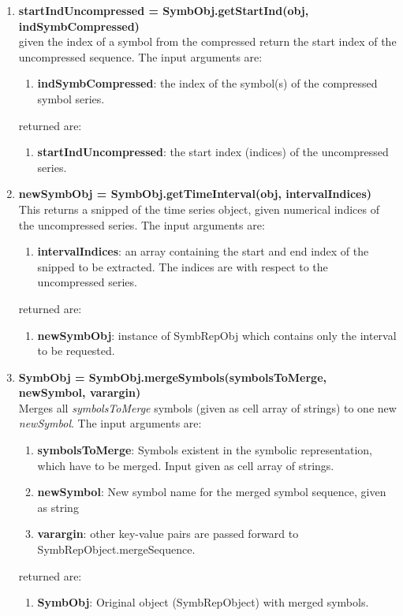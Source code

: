 \documentclass[a4]{scrreprt}
\begin{document}
\begin{enumerate}
	\item \textbf{startIndUncompressed = SymbObj.getStartInd(obj, indSymbCompressed)}\\
		given the index of a symbol from the compressed return the start index of the uncompressed sequence.
		The input arguments are:
		\begin{enumerate}
			\item \textbf{indSymbCompressed}: the index of the symbol(s) of the  compressed symbol series.
		\end{enumerate}
		returned are:
		\begin{enumerate}
			\item \textbf{startIndUncompressed}:  the start index (indices) of the uncompressed series.	
		\end{enumerate}
	
	\item \textbf{newSymbObj = SymbObj.getTimeInterval(obj, intervalIndices)}\\
		This returns a snipped of the time series object, given numerical indices of the uncompressed series.
		The input arguments are:
		\begin{enumerate}
			\item \textbf{intervalIndices}: an array containing the start and end index of the snipped to be extracted. The indices are with  respect to the uncompressed series.
		\end{enumerate}
		returned are:
		\begin{enumerate}
			\item \textbf{newSymbObj}:  instance of SymbRepObj which contains only the interval to be requested.
		\end{enumerate}
	
	\item \textbf{SymbObj = SymbObj.mergeSymbols(symbolsToMerge, newSymbol, varargin)}\\
		Merges all \textit{symbolsToMerge} symbols (given as cell array of strings) to one new \textit{newSymbol}.
		The input arguments are:
		\begin{enumerate}
			\item \textbf{symbolsToMerge}: Symbols existent in the symbolic representation,  which have to be merged. Input given as cell array of strings.
			\item \textbf{newSymbol}:  New symbol name for the merged symbol sequence, given as  string
			\item \textbf{varargin}: other key-value pairs are passed forward to SymbRepObject.mergeSequence.
		\end{enumerate}
		returned are:
		\begin{enumerate}
			\item \textbf{SymbObj}:  Original object (SymbRepObject) with merged symbols.
		\end{enumerate}
	

\end{enumerate}
\end{document}

